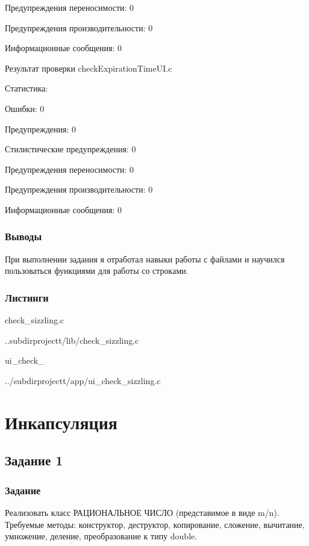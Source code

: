 \documentclass[12pt,a4paper]{report}
\begin{document}
Предупреждения переносимости:	0

Предупреждения производительности:	0

Информационные сообщения:	0


\vspace{\baselineskip}


Результат проверки checkExpirationTimeUI.c 

Статистика:

Ошибки:	0

Предупреждения:	0

Стилистические предупреждения:	0

Предупреждения переносимости:	0

Предупреждения производительности:	0

Информационные сообщения:	0





\vspace{\baselineskip}

\subsection{Выводы}

При выполнении задания я отработал навыки работы с файлами и научился пользоваться функциями для работы со строками.
\subsection*{Листинги}
check_sizzling.c

{..subdirprojectt/lib/check_sizzling.c}

\vspace{\baselineskip}

ui_check_

{../subdirprojectt/app/ui_check_sizzling.c}


\chapter{Инкапсуляция}
\section{Задание 1}
\subsection{Задание}

Реализовать класс РАЦИОНАЛЬНОЕ ЧИСЛО (представимое в виде m/n). Требуемые методы: конструктор, деструктор, копирование, сложение, вычитание, умножение, деление, преобразование к типу double.
\end{document}
